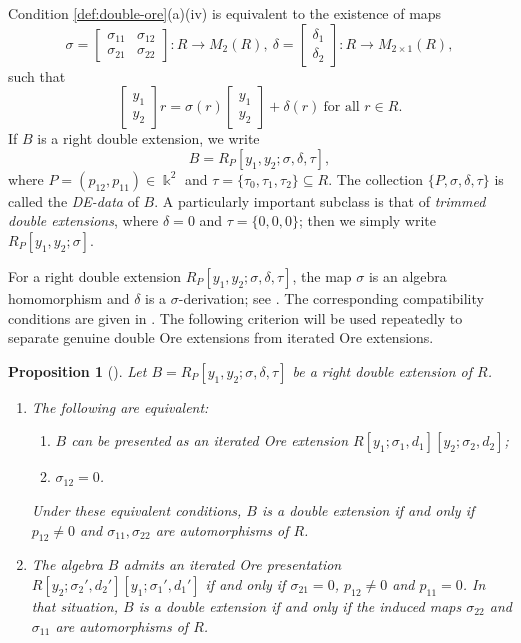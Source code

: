\documentclass[reqno]{amsart}
\numberwithin{equation}{section}
\newtheorem{proposition}[theorem]{Proposition}
\theoremstyle{definition}
\begin{document}
Condition \ref{def:double-ore}\rm(a)(iv) is equivalent to the existence of maps
\[
\sigma=
\begin{bmatrix}
\sigma_{11} & \sigma_{12}\\
\sigma_{21} & \sigma_{22}
\end{bmatrix}:R\to M_2(R),
\
\delta=
\begin{bmatrix}
\delta_1\\
\delta_2
\end{bmatrix}:R\to M_{2\times 1}(R),
\]
such that
\begin{equation}\label{eq:sigma-delta-action}
\begin{bmatrix}
y_1\\ y_2
\end{bmatrix}r
=
\sigma(r)\begin{bmatrix}
y_1\\ y_2
\end{bmatrix}
+\delta(r)
\ \text{for all } r\in R.
\end{equation}
If \(B\) is a right double extension, we write
\[
B=R_P[y_1,y_2;\sigma,\delta,\tau],
\]
where \(P=(p_{12},p_{11})\in\Bbbk^2\) and \(\tau=\{\tau_0,\tau_1,\tau_2\}\subseteq R\). The collection \(\{P,\sigma,\delta,\tau\}\) is called the \emph{DE-data} of \(B\). A particularly important subclass is that of \emph{trimmed double extensions}, where \(\delta=0\) and \(\tau=\{0,0,0\}\); then we simply write \(R_P[y_1,y_2;\sigma]\).

For a right double extension \(R_P[y_1,y_2;\sigma,\delta,\tau]\), the map \(\sigma\) is an algebra homomorphism and \(\delta\) is a \(\sigma\)-derivation; see \cite[Lemma~1.7]{ZZ08}. The corresponding compatibility conditions are given in \cite[Proposition~1.5]{CLM11}. The following criterion will be used repeatedly to separate genuine double Ore extensions from iterated Ore extensions.

\begin{proposition}[{\cite[Theorems~2.2 and~2.4]{CLM11}}]\label{prop:iterated-criterion}
Let \(B=R_P[y_1,y_2;\sigma,\delta,\tau]\) be a right double extension of \(R\).
\begin{enumerate}[label=\rm (\arabic*)]
    \item The following are equivalent:
    \begin{enumerate}[label=\rm (\roman*)]
        \item \(B\) can be presented as an iterated Ore extension \(R[y_1;\sigma_1,d_1][y_2;\sigma_2,d_2]\);
        \item \(\sigma_{12}=0\).
    \end{enumerate}
    Under these equivalent conditions, \(B\) is a double extension if and only if \(p_{12}\neq 0\) and \(\sigma_{11},\sigma_{22}\) are automorphisms of \(R\).
    \item The algebra \(B\) admits an iterated Ore presentation \(R[y_2;\sigma_2',d_2'][y_1;\sigma_1',d_1']\) if and only if \(\sigma_{21}=0\), \(p_{12}\neq 0\) and \(p_{11}=0\). In that situation, \(B\) is a double extension if and only if the induced maps \(\sigma_{22}\) and \(\sigma_{11}\) are automorphisms of \(R\).
\end{enumerate}
\end{proposition}
\end{document}
